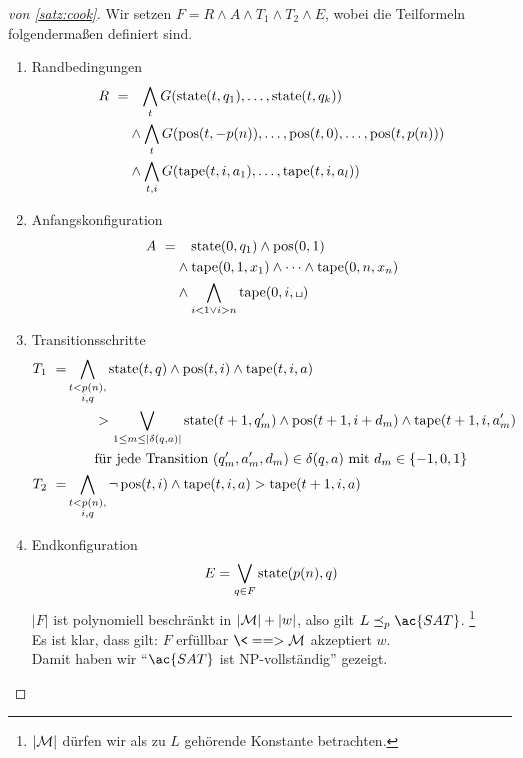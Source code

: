 \begin{proof}[von \autoref{satz:cook}]
	Wir setzen $F = R \land A\land T_1 \land T_2 \land E$, wobei die Teilformeln folgendermaßen definiert sind.
	\begin{enumerate}
	\item Randbedingungen
		\begin{align*}
			R\ =&\phantom{\land}\, \bigwedge_t G(\operatorname{state}(t,q_1),\dots,\operatorname{state}(t,q_k))\\
			& \land \bigwedge_t G(\operatorname{pos}(t,-p(n)),\dots,\operatorname{pos}(t,0),\dots,\operatorname{pos}(t,p(n)))\\
			& \land \bigwedge_{t,i} G(\operatorname{tape}(t,i,a_1),\dots,\operatorname{tape}(t,i,a_l))
		\end{align*}
	\item Anfangskonfiguration
		\begin{align*}
			A\ =&\phantom{\land}\; \state(0,q_1)\land \pos(0,1)\\
			&\land\tape(0,1,x_1)\land\dots\land\tape(0,n,x_n)\\
			&\land\bigwedge_{i< 1 \lor i > n} \tape(0,i,\blank)
		\end{align*}
	\item Transitionsschritte
	\begin{align*}
		T_1\ =& \bigwedge_{\substack{t < p(n),\\i,q}} \operatorname{state}(t,q)\land \operatorname{pos}(t,i) \land \operatorname{tape}(t,i,a)\\
		&\qquad \-> \bigvee_{1 \leq m \leq |\delta(q,a)|} \operatorname{state}(t+1,q_m')\land \operatorname{pos}(t+1,i+d_m) \land \operatorname{tape}(t+1,i,a_m')\\
		&\qquad \text{für jede Transition } (q_m',a_m',d_m) \in \delta(q,a) \text{ mit } d_m\in\{-1,0,1\}\\
		T_2\ =& \bigwedge_{\substack{t < p(n),\\i,q}} \neg \operatorname{pos}(t,i)\land \operatorname{tape}(t,i,a) \-> \operatorname{tape}(t+1,i,a)
	\end{align*}
	\item Endkonfiguration%
		\[ E = \bigvee_{q\in F} \operatorname{state}(p(n),q) \]
		$|F|$ ist polynomiell beschränkt in $|\mathcal{M}|+|w|$, also gilt $L\preceq_p \ac{SAT}$.%
		\footnote{$|\mathcal{M}|$ dürfen wir als zu $L$ gehörende Konstante betrachten.}\\
		Es ist klar, dass gilt: $F$ erfüllbar $\<==> \M$ akzeptiert $w$.\\
		Damit haben wir "`$\ac{SAT}$ ist \ac{NP}-vollständig"' gezeigt.
		\qedhere
	\end{enumerate}
\end{proof}

